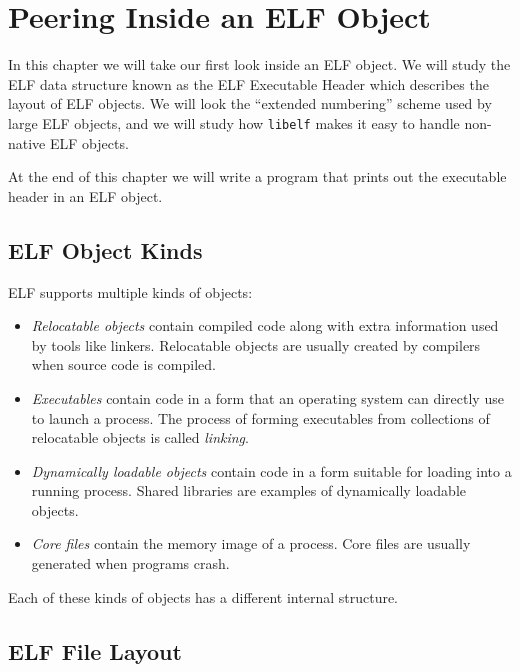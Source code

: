 \documentclass[a4paper,pdftex]{book}
\newcommand{\firstterm}[1]{\textit{#1}}
\newcommand{\library}[1]{\texttt{#1}}
\newcommand{\elfdatastructure}[1]{\textsf{#1}}
\begin{document}
\chapter{Peering Inside an ELF Object}\label{chap.peering-inside}

In this chapter we will take our first look inside an ELF object. We
will study the ELF data structure known as the ELF
\elfdatastructure{Executable Header} which describes the layout of ELF
objects.  We will look the ``extended numbering'' scheme used by
large ELF objects, and we will study how \library{libelf} makes
it easy to handle non-native ELF objects.

At the end of this chapter we will write a program that prints out
the executable header in an ELF object.

\section{ELF Object Kinds}
ELF supports multiple kinds of objects:

\begin{itemize}
\item \firstterm{Relocatable objects}
  contain compiled code along with extra information used by tools
  like linkers. Relocatable objects are usually created by compilers
  when source code is compiled.
\item \firstterm{Executables} contain
  code in a form that an operating system can directly use to launch a
  process.  The process of forming executables from collections of
  relocatable objects is called
  \firstterm{linking}.
\item \firstterm{Dynamically loadable objects} contain code in a form suitable for
  loading into a running process. Shared
  libraries are examples of dynamically loadable
  objects.
\item \firstterm{Core files} contain the memory
  image of a process. Core files are usually generated when programs
  crash.
\end{itemize}

Each of these kinds of objects has a different internal structure.

\section{ELF File Layout}
\end{document}
